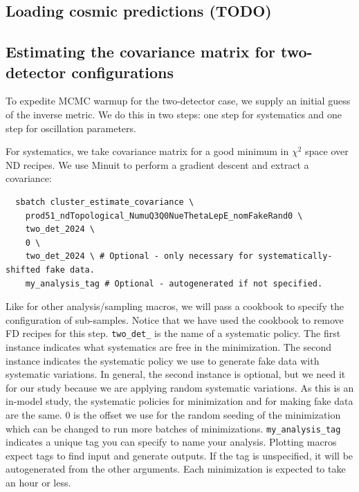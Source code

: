 \documentclass{article}
\begin{document}
\subsection{Loading cosmic predictions (TODO)}

\subsection{Estimating the covariance matrix for two-detector configurations}
To expedite MCMC warmup for the two-detector case, we supply an initial guess of the inverse metric. We do this in two steps: one step for systematics and one step for oscillation parameters.

For systematics, we take covariance matrix for a good minimum in $\chi^2$ space over ND recipes. We use Minuit to perform a gradient descent and extract a covariance:
\begin{verbatim}
  sbatch cluster_estimate_covariance \
    prod51_ndTopological_NumuQ3Q0NueThetaLepE_nomFakeRand0 \
    two_det_2024 \
    0 \
    two_det_2024 \ # Optional - only necessary for systematically-shifted fake data.
    my_analysis_tag # Optional - autogenerated if not specified.
\end{verbatim}
Like for other analysis/sampling macros, we will pass a cookbook to specify the configuration of sub-samples. Notice that we have used the cookbook to remove FD recipes for this step. \texttt{two\_\-det\_} is the name of a systematic policy. The first instance indicates what systematics are free in the minimization. The second instance indicates the systematic policy we use to generate fake data with systematic variations. In general, the second instance is optional, but we need it for our study because we are applying random systematic variations. As this is an in-model study, the systematic policies for minimization and for making fake data are the same. 0 is the offset we use for the random seeding of the minimization which can be changed to run more batches of minimizations. \texttt{my\_\-analysis\_\-tag} indicates a unique tag you can specify to name your analysis. Plotting macros expect tags to find input and generate outputs. If the tag is unspecified, it will be autogenerated from the other arguments. Each minimization is expected to take an hour or less.
\end{document}
